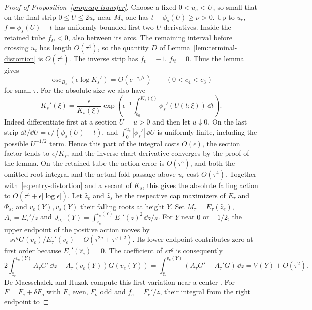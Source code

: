 \begin{proof}[Proof of Proposition~\ref{prop:cap-transfer}]
Choose a fixed $0<u_c<U_e$ so small that on the final strip
$0\le U\le 2u_c$ near $M_s$ one has $t-\phi_s(U)\ge\nu>0$.
Up to $u_c$, $f=\phi_s(U)-t$ has uniformly bounded first two
$U$ derivatives. Inside the retained tube $f_U<0$, also between
its arcs. The remaining interval before crossing $u_c$ has length
$O(\tau^4)$, so the quantity $D$ of Lemma~\ref{lem:terminal-distortion}
is $O(\tau^4)$. The inverse strip has $f_t=-1$, $f_{tt}=0$.
Thus the lemma gives
\begin{equation}\label{eq:cap-osc}
 \operatorname{osc}_{B_s}(\epsilon\log K_s')=O(e^{-c_4/\epsilon})
 \qquad(0<c_4<c_3)
\end{equation}
for small $\tau$. For the absolute size we also have
\begin{equation}\label{eq:Ks-deriv}
 K_s'(\xi)=\frac{\epsilon}{K_s(\xi)}
 \exp\!\left(\epsilon^{-1}\int_{b_0}^{K_s(\xi)}
                           \phi_s'(U(t;\xi))\,\dd t\right).
\end{equation}
Indeed differentiate first at a section $U=u>0$ and then let
$u\downarrow0$. On the last strip $\dd t/\dd U=\epsilon/(\phi_s(U)-t)$,
and $\int_0^{u_c}|\phi_s'|\,\dd U$ is uniformly finite, including
the possible $U^{-1/2}$ term. Hence this part of the integral costs
$O(\epsilon)$, the section factor tends to $\epsilon/K_s$, and the
inverse-chart derivative converges by the proof of the lemma.
On the retained tube the action error is $O(\tau^5)$, and both the
omitted root integral and the actual fold passage above $u_c$ cost
$O(\tau^4)$. Together with~\eqref{eq:entry-distortion} and a secant
of $K_s$, this gives the absolute falling action to $O(\tau^4+
\epsilon|\log\epsilon|)$.
Let $\widehat z_e$ and $\widehat z_s$ be the respective cap maximizers
of $E_\tau$ and $\Phi_s$, and $v_e(Y),v_s(Y)$ their falling roots at
height $Y$. Set $M_\tau=E_\tau(\widehat z_e)$,
$A_\tau=E_\tau'/z$ and
$J_{o,\tau}(Y)=\int_{\widehat z_e}^{v_e(Y)}E_\tau'(z)^2\,\dd z/z$.
For $Y$ near $0$ or $-1/2$, the upper endpoint of the positive action
moves by $-s\tau^gG(v_e)/E_\tau'(v_e)+O(\tau^{2g}+\tau^{g+2})$.
Its lower endpoint contributes zero at first order because
$E_\tau'(\widehat z_e)=0$. The coefficient of $s\tau^g$ is consequently
\[
 2\int_{\widehat z_e}^{v_e(Y)} A_\tau G'\,\dd z-A_\tau(v_e(Y))G(v_e(Y))
 =\int_{\widehat z_e}^{v_e(Y)}(A_\tau G'-A_\tau'G)\,\dd z
 = V(Y)+O(\tau^2).
\]
De Maesschalck and Huzak compute this first variation near a center
\cite[Proposition~1]{DMH2015}. For $F=F_e+\delta F_o$ with $F_e$ even,
$F_o$ odd and $f_e=F_e'/z$, their integral from the right endpoint to

\end{proof}
